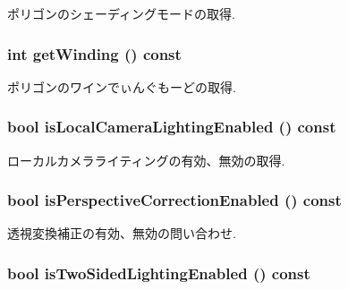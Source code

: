 ポリゴンのシェーディングモードの取得. \hypertarget{classm3g_1_1PolygonMode_6000aac10def51a7c7f12e1381bce19d}{
\subsubsection[{getWinding}]{\setlength{\rightskip}{0pt plus 5cm}int getWinding () const}}
\label{classm3g_1_1PolygonMode_6000aac10def51a7c7f12e1381bce19d}


ポリゴンのワインでぃんぐもーどの取得. \hypertarget{classm3g_1_1PolygonMode_b8db417fcee613ac80e84087046930cd}{
\subsubsection[{isLocalCameraLightingEnabled}]{\setlength{\rightskip}{0pt plus 5cm}bool isLocalCameraLightingEnabled () const}}
\label{classm3g_1_1PolygonMode_b8db417fcee613ac80e84087046930cd}


ローカルカメラライティングの有効、無効の取得. \hypertarget{classm3g_1_1PolygonMode_76ec871d6ed45e6e6a8822f5c45c828b}{
\subsubsection[{isPerspectiveCorrectionEnabled}]{\setlength{\rightskip}{0pt plus 5cm}bool isPerspectiveCorrectionEnabled () const}}
\label{classm3g_1_1PolygonMode_76ec871d6ed45e6e6a8822f5c45c828b}


透視変換補正の有効、無効の問い合わせ. \hypertarget{classm3g_1_1PolygonMode_e7b9f0464063485b025f11a310bb0b80}{
\subsubsection[{isTwoSidedLightingEnabled}]{\setlength{\rightskip}{0pt plus 5cm}bool isTwoSidedLightingEnabled () const}}
\label{classm3g_1_1PolygonMode_e7b9f0464063485b025f11a310bb0b80}


